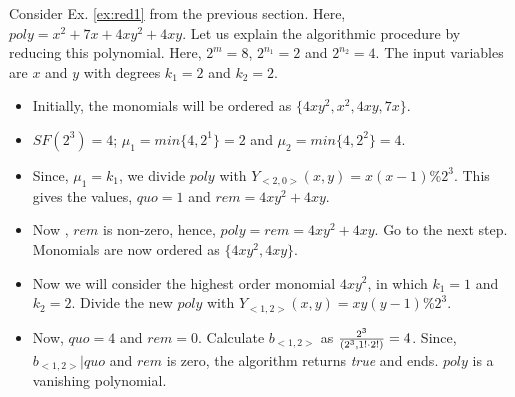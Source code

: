 
\begin{Example}\label{ex:algo}
Consider Ex. \ref{ex:red1} from the previous section. Here, $poly = x^2 +
7x + 4xy^2 + 4xy$. Let us explain the algorithmic procedure by
reducing this polynomial. Here, $2^m = 8$, $2^{n_1} = 2$ and $2^{n_2} = 4$. The
input variables are $x$ and $y$ with degrees $k_1 =2$ and $k_2 = 2$. 
\begin{itemize}
\item Initially, the monomials will be ordered as $\{ 4xy^2, x^2, 4xy, 7x\}$.
\item $SF(2^3) = 4$; $\mu_1 = min\{4, 2^1\} = 2$ and $\mu_2 =
  min\{4,2^2\} = 4$.
\item Since, $\mu_1 = k_1$, we divide $poly$ with $Y_{<2,0>}(x,y) = x(x-1)
  \% 2^3$. This gives the values, $quo = 1$ and $rem = 4xy^2 + 4xy$.
\item Now , $rem$ is non-zero, hence, $poly = rem = 4xy^2 + 4xy$. Go
  to the next step. Monomials are now ordered as $\{4xy^2, 4xy\}$.
\item Now we will consider the highest order monomial $4xy^2$, in
  which $k_1=1$ and $k_2 = 2$. Divide the new $poly$ with
  $Y_{<1,2>}(x,y) = xy(y-1) \% 2^3$. 
\item Now, $quo = 4$ and $rem = 0$. Calculate $b_{<1,2>}$ as
  ${{2^3}\over{(2^3, 1!\cdot 2!)}} = 4$. Since, $b_{<1,2>}|quo$ and $rem$ is
  zero, the algorithm returns {\it true} and ends. $poly$ is a
  vanishing polynomial.
\end{itemize}
\end{Example}


